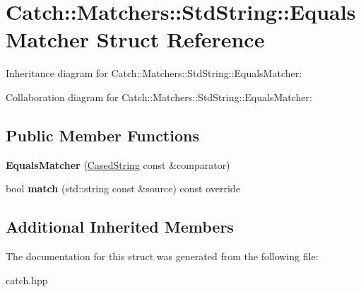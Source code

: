 \hypertarget{structCatch_1_1Matchers_1_1StdString_1_1EqualsMatcher}{}\section{Catch\+:\+:Matchers\+:\+:Std\+String\+:\+:Equals\+Matcher Struct Reference}
\label{structCatch_1_1Matchers_1_1StdString_1_1EqualsMatcher}


Inheritance diagram for Catch\+:\+:Matchers\+:\+:Std\+String\+:\+:Equals\+Matcher\+:


Collaboration diagram for Catch\+:\+:Matchers\+:\+:Std\+String\+:\+:Equals\+Matcher\+:
\subsection*{Public Member Functions}
\begin{DoxyCompactItemize}
\item 
\mbox{\label{structCatch_1_1Matchers_1_1StdString_1_1EqualsMatcher_ab740f1fb2310e9fe3fed5134d4c7e4c8}} 
{\bfseries Equals\+Matcher} (\hyperlink{structCatch_1_1Matchers_1_1StdString_1_1CasedString}{Cased\+String} const \&comparator)
\item 
\mbox{\label{structCatch_1_1Matchers_1_1StdString_1_1EqualsMatcher_a0bb9d64693f7bb1ef7441062d219f21a}} 
bool {\bfseries match} (std\+::string const \&source) const override
\end{DoxyCompactItemize}
\subsection*{Additional Inherited Members}


The documentation for this struct was generated from the following file\+:\begin{DoxyCompactItemize}
\item 
catch.\+hpp\end{DoxyCompactItemize}

